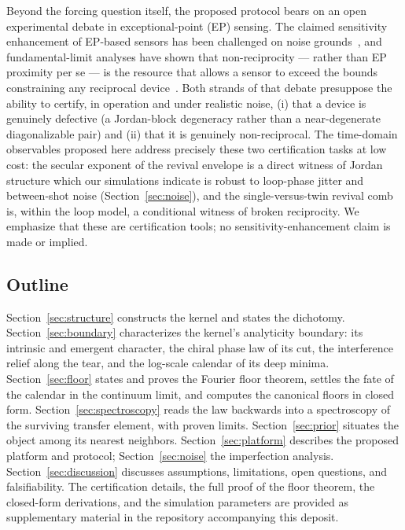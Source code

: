 \documentclass[11pt,a4paper]{article}
\begin{document}
Beyond the forcing question itself, the proposed protocol bears on an open
experimental debate in exceptional-point (EP) sensing. The claimed sensitivity
enhancement of EP-based sensors has been challenged on noise
grounds~\cite{Langbein2018,Wiersig2020}, and fundamental-limit analyses have
shown that non-reciprocity --- rather than EP proximity per se --- is the
resource that allows a sensor to exceed the bounds constraining any reciprocal
device~\cite{LauClerk2018}. Both strands of that debate presuppose the ability
to certify, in operation and under realistic noise, (i) that a device is
genuinely defective (a Jordan-block degeneracy rather than a near-degenerate
diagonalizable pair) and (ii) that it is genuinely non-reciprocal. The
time-domain observables proposed here address precisely these two
certification tasks at low cost: the secular exponent of the revival envelope
is a direct witness of Jordan structure which our simulations indicate is
robust to loop-phase jitter and between-shot noise (Section~\ref{sec:noise}),
and the single-versus-twin revival comb is, within the loop model, a
conditional witness of broken
reciprocity. We emphasize that these are certification tools; no
sensitivity-enhancement claim is made or implied.

\subsection{Outline}

Section~\ref{sec:structure} constructs the kernel and states the dichotomy.
Section~\ref{sec:boundary} characterizes the kernel's analyticity
boundary: its intrinsic and emergent character, the chiral phase law of
its cut, the interference relief along the tear, and the log-scale
calendar of its deep minima. Section~\ref{sec:floor} states and proves
the Fourier floor theorem, settles the fate of the calendar in the
continuum limit, and computes the canonical floors in closed form.
Section~\ref{sec:spectroscopy} reads the law backwards into a spectroscopy
of the surviving transfer element, with proven limits.
Section~\ref{sec:prior} situates the object among its nearest neighbors.
Section~\ref{sec:platform} describes the proposed platform and protocol;
Section~\ref{sec:noise} the imperfection analysis. Section~\ref{sec:discussion}
discusses assumptions, limitations, open questions, and falsifiability. The
certification details, the full proof of the floor theorem, the closed-form derivations, and the simulation
parameters are provided as supplementary material in the repository
accompanying this deposit.
\end{document}
